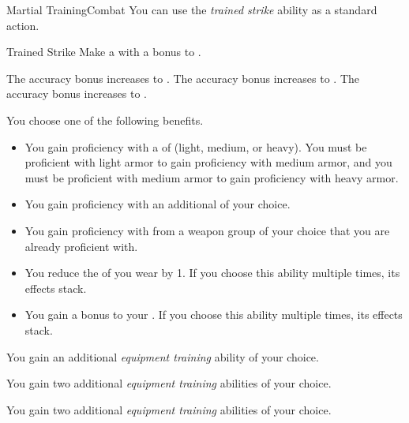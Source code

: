     \begin{feat}{Martial Training}{Combat}
         You can use the \textit{trained strike} ability as a standard action.
        \begin{activeability}{Trained Strike}
            \rankline
            Make a  with a  bonus to .

            \rankline
             The accuracy bonus increases to .
             The accuracy bonus increases to .
             The accuracy bonus increases to .
        \end{activeability}

         You choose one of the following benefits.
        \begin{itemize}
            \item You gain proficiency with a  of  (light, medium, or heavy).
                You must be proficient with light armor to gain proficiency with medium armor, and you must be proficient with medium armor to gain proficiency with heavy armor.
            \item You gain proficiency with an additional  of your choice.
            \item You gain proficiency with  from a weapon group of your choice that you are already proficient with.
            \item You reduce the  of  you wear by 1.
                If you choose this ability multiple times, its effects stack.
            \item You gain a  bonus to your .
                If you choose this ability multiple times, its effects stack.
        \end{itemize}

         You gain an additional \textit{equipment training} ability of your choice.

         You gain two additional \textit{equipment training} abilities of your choice.

         You gain two additional \textit{equipment training} abilities of your choice.
    \end{feat}

